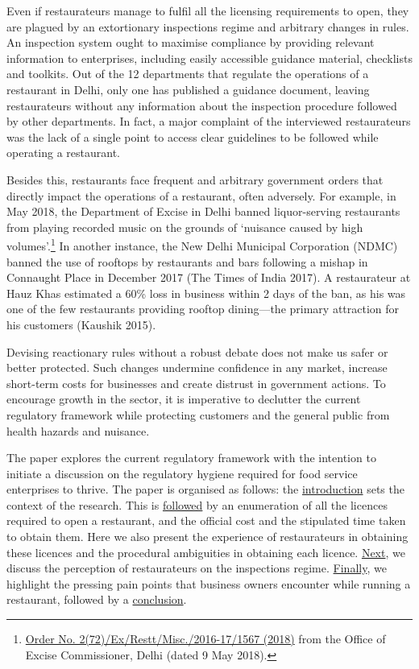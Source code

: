 \documentclass[a4paper, 12pt]{article}
\begin{document}
                    Even if restaurateurs manage to fulfil all the licensing requirements to open, they are plagued by an extortionary inspections regime and arbitrary changes in rules. An inspection system ought to maximise compliance by providing relevant information to 
enterprises, including easily accessible guidance material, checklists and toolkits. Out of the 12 departments that regulate the operations of a restaurant in Delhi, only one has published a guidance document, leaving restaurateurs without any information about the 
inspection procedure followed by other departments. In fact, a major complaint of the interviewed restaurateurs was the lack of a single point to access clear guidelines to be followed while operating a restaurant.
                    
                    Besides this, restaurants face frequent and arbitrary government orders that directly impact the operations of a restaurant, often adversely. For example, in May 2018, the Department of Excise in Delhi banned liquor-serving restaurants from playing 
recorded music on the grounds of ‘nuisance caused by high volumes’.\footnote{\href{https://bit.ly/2MzCM02}{Order No. 2(72)/Ex/Restt/Misc./2016-17/1567 (2018)} from the Office of Excise Commissioner, Delhi (dated 9 May 2018).} In another instance, the New 
Delhi Municipal Corporation (NDMC) banned the use of rooftops by restaurants and bars following a mishap in Connaught Place in December 2017 (The Times of India 2017). A restaurateur at Hauz Khas estimated a 60\% loss in business  within 2 days of the ban, 
as his was one of the few restaurants providing rooftop dining—the primary attraction for his customers (Kaushik 2015). %
                    
                    Devising reactionary rules without a robust debate does not make us safer or better protected. Such changes undermine confidence in any market, increase short-term costs for businesses and create distrust in government actions. To encourage 
growth in the sector, it is imperative to declutter the current regulatory framework while protecting customers and the general public from health hazards and nuisance. 
                    
                   The paper explores the current regulatory framework with the intention to initiate a discussion on the regulatory hygiene required for food service enterprises to thrive. The paper is organised as follows: the \hyperref[intro]{introduction} sets the context of 
the research. This is \hyperref[sec:1]{followed} by an enumeration of all the licences required to open a restaurant, and the official cost and the stipulated time taken to obtain them. Here we also present the experience of restaurateurs in obtaining these licences 
and the procedural ambiguities in obtaining each licence. \hyperref[sec:2]{Next}, we discuss the perception of restaurateurs on the inspections regime. \hyperref[sec:3]{Finally}, we highlight the pressing pain points that business owners encounter while running a 
restaurant, followed by a \hyperref[end]{conclusion}.  %
\end{document}
